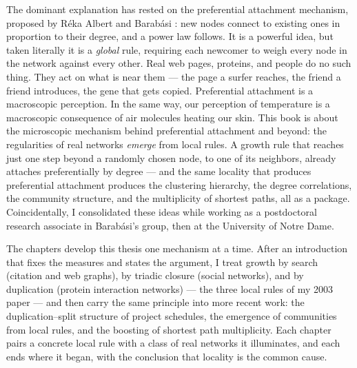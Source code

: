 \documentclass[10pt]{book}
\begin{document}
The dominant explanation has rested on the preferential attachment mechanism, 
proposed by R\'eka Albert and Barab\'asi \citeyearpar{barabasi1999}: new nodes connect to existing ones
in proportion to their degree, and a power law follows. It is a powerful 
idea, but taken literally it is a \emph{global} rule, requiring each newcomer 
to weigh every node in the network against every other. Real web pages, 
proteins, and people do no such thing. They act on what is near them --- the 
page a surfer reaches, the friend a friend introduces, the gene that gets 
copied. Preferential attachment is a macroscopic perception. In the same way, our perception of temperature is a macroscopic consequence of air molecules heating our skin. This book is about the microscopic mechanism behind 
preferential attachment and beyond: the regularities of real networks 
\emph{emerge} from local rules. A growth rule that reaches just one step 
beyond a randomly chosen node, to one of its neighbors, already attaches 
preferentially by degree --- and the same locality that produces preferential 
attachment produces the clustering hierarchy, the degree correlations, the 
community structure, and the multiplicity of shortest paths, all as a 
package. Coincidentally, I consolidated these ideas while working as a postdoctoral research associate in Barab\'asi's group, then at the University of Notre Dame.

The chapters develop this thesis one mechanism at a time. After an introduction
that fixes the measures and states the argument, I treat growth by search
(citation and web graphs), by triadic closure (social networks), and by
duplication (protein interaction networks) --- the three local rules of my 2003
paper --- and then carry the same principle into more recent work: the
duplication--split structure of project schedules, the emergence of communities
from local rules, and the boosting of shortest path multiplicity. Each chapter
pairs a concrete local rule with a class of real networks it illuminates, and
each ends where it began, with the conclusion that locality is the common cause.
\end{document}
